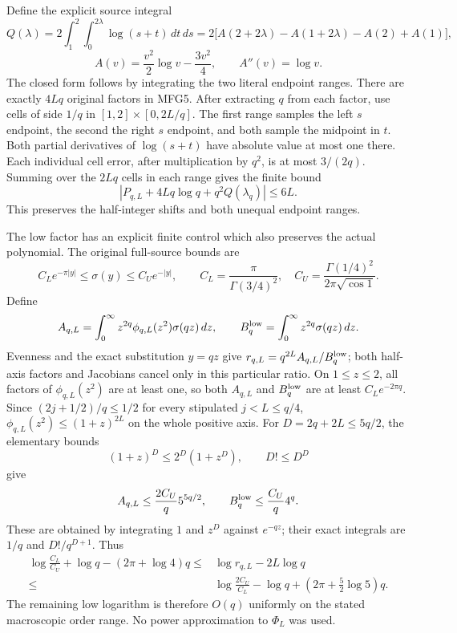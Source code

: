 Define the explicit source integral
\[
 Q(\lambda)=2\int_1^2\int_0^{2\lambda}\log(s+t)\,dt\,ds
 =2\big[A(2+2\lambda)-A(1+2\lambda)-A(2)+A(1)\big],
\]
\[
 A(v)=\frac{v^2}{2}\log v-\frac{3v^2}{4},\qquad A''(v)=\log v.
 \tag{MFG20}
\]
The closed form follows by integrating the two literal endpoint ranges.
There are exactly $4Lq$ original factors in MFG5. After extracting
$q$ from each factor, use cells of side $1/q$ in
$[1,2]\times[0,2L/q]$. The first range samples the left $s$ endpoint,
the second the right $s$ endpoint, and both sample the midpoint in $t$.
Both partial derivatives of $\log(s+t)$ have absolute value at most
one there. Each individual cell error, after multiplication by $q^2$,
is at most $3/(2q)$. Summing over the $2Lq$ cells in each range gives
the finite bound
\[
 \boxed{\left|P_{q,L}+4Lq\log q+q^2Q(\lambda_q)\right|\le6L.}
 \tag{MFG21}
\]
This preserves the half-integer shifts and both unequal endpoint ranges.

The low factor has an explicit finite control which also preserves
the actual polynomial. The original full-source bounds are
\[
 C_Le^{-\pi|y|}\le\sigma(y)\le C_Ue^{-|y|},\qquad
 C_L=\frac{\pi}{\Gamma(3/4)^2},\quad
 C_U=\frac{\Gamma(1/4)^2}{2\pi\sqrt{\cos1}}.
\]
Define
\[
 A_{q,L}=\int_0^\infty z^{2q}\phi_{q,L}(z^2)\sigma(qz)\,dz,
 \qquad B_q^{\rm low}=\int_0^\infty z^{2q}\sigma(qz)\,dz.
\]
Evenness and the exact substitution $y=qz$ give
$r_{q,L}=q^{2L}A_{q,L}/B_q^{\rm low}$; both half-axis factors and
Jacobians cancel only in this particular ratio.
On $1\le z\le2$, all factors of $\phi_{q,L}(z^2)$ are at least one,
so both $A_{q,L}$ and $B_q^{\rm low}$ are at least $C_Le^{-2\pi q}$.
Since $(2j+1/2)/q\le1/2$ for every stipulated $j<L\le q/4$,
$\phi_{q,L}(z^2)\le(1+z)^{2L}$ on the whole positive axis.
For $D=2q+2L\le5q/2$, the elementary bounds
\[
 (1+z)^D\le2^D(1+z^D),\qquad D!\le D^D
\]
give
\[
 A_{q,L}\le\frac{2C_U}{q}5^{5q/2},\qquad
 B_q^{\rm low}\le\frac{C_U}{q}4^q.
\]
These are obtained by integrating $1$ and $z^D$ against $e^{-qz}$;
their exact integrals are $1/q$ and $D!/q^{D+1}$. Thus
\[
 \boxed{\begin{aligned}
 \log\frac{C_L}{C_U}+\log q-(2\pi+\log4)q
 \le{}&\log r_{q,L}-2L\log q\\
 \le{}&\log\frac{2C_U}{C_L}-\log q
                      +(2\pi+\tfrac52\log5)q.
 \end{aligned}}
 \tag{MFG22}
\]
The remaining low logarithm is therefore $O(q)$ uniformly on the stated
macroscopic order range. No power approximation to $\Phi_L$ was used.

